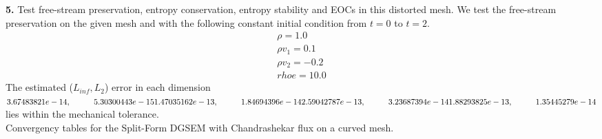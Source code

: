 \documentclass[11pt]{scrartcl}
\begin{document}
\textbf{5.} Test free-stream preservation, entropy conservation, entropy stability and EOCs in this distorted mesh.
We test the free-stream preservation on the given mesh and with the following constant initial condition from $t=0$ to $t=2$.
\begin{align*}
\rho = 1.0 \\
  \rho v_1 = 0.1 \\
  \rho v_2 = -0.2 \\
  rho e = 10.0
\end{align*}
The estimated ($L_{inf}, L_2$) error in each dimension \\
$3.67483821e-14, \hspace{1cm} 5.30300443e-15 \\  1.47035162e-13, \hspace{1cm} 1.84694396e-14\\  2.59042787e-13, \hspace{1cm} 3.23687394e-14 \\ 1.88293825e-13, \hspace{1cm} 1.35445279e-14$ \\

lies within the mechanical tolerance.\\
Convergency tables for the Split-Form DGSEM with Chandrashekar flux on a curved mesh.
\end{document}
